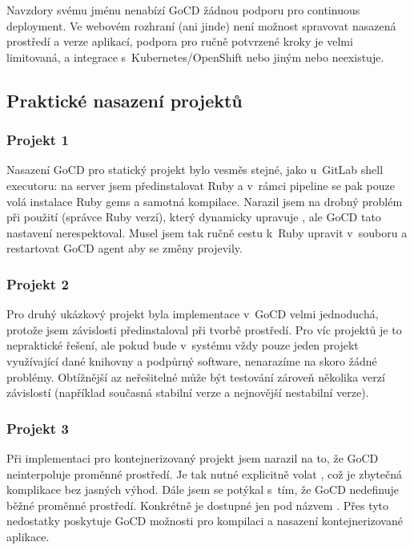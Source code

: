         Navzdory svému jménu nenabízí GoCD žádnou podporu pro continuous deployment. Ve webovém rozhraní (ani jinde) není možnost spravovat nasazená prostředí a verze aplikací, podpora pro ručně potvrzené kroky je velmi limitovaná, a integrace s~Kubernetes/OpenShift nebo jiným  nebo neexistuje.

    \subsection{Praktické nasazení projektů}
        \subsubsection{Projekt 1}
            Nasazení GoCD pro statický projekt bylo vesměs stejné, jako u~GitLab shell executoru: na server jsem předinstalovat Ruby a v~rámci pipeline se pak pouze volá instalace Ruby gems a samotná kompilace. Narazil jsem na drobný problém při použití  (správce Ruby verzí), který dynamicky upravuje , ale GoCD tato nastavení nerespektoval. Musel jsem tak ručně cestu k~Ruby upravit v~souboru  a restartovat GoCD agent aby se změny projevily.

        \subsubsection{Projekt 2}
            Pro druhý ukázkový projekt byla implementace v~GoCD velmi jednoduchá, protože jsem závislosti předinstaloval při tvorbě prostředí. Pro víc projektů je to nepraktické řešení, ale pokud bude v~systému vždy pouze jeden projekt využívající dané knihovny a podpůrný software, nenarazíme na skoro žádné problémy. Obtížnější az neřešitelné může být testování zároveň několika verzí závislostí (například současná stabilní verze a nejnovější nestabilní verze).

        \subsubsection{Projekt 3}
            Při implementaci \CI pro kontejnerizovaný projekt jsem narazil na to, že GoCD neinterpoluje proměnné prostředí. Je tak nutné explicitně volat , což je zbytečná komplikace bez jasných výhod. Dále jsem se potýkal s~tím, že GoCD nedefinuje běžné proměnné prostředí. Konkrétně  je dostupné jen pod názvem . Přes tyto nedostatky poskytuje GoCD možnosti pro kompilaci a nasazení kontejnerizované aplikace.
